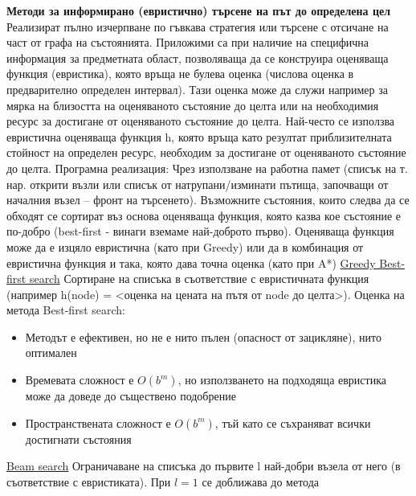 \documentclass{article}
\begin{document}
\textbf{Методи за информирано (евристично) търсене на път до определена цел} \newline\newline
Реализират пълно изчерпване по гъвкава стратегия или търсене с отсичане на част от графа на състоянията. Приложими са при
наличие на специфична информация за предметната област, позволяваща да се конструира оценяваща функция (евристика), която връща
не булева оценка (числова оценка в предварително определен интервал). Тази оценка може да служи например за мярка на близостта на
оценяваното състояние до целта или на необходимия ресурс за достигане от оценяваното състояние до целта. Най-често се използва
евристична оценяваща функция h, която връща като резултат приблизителната стойност на определен ресурс, необходим за достигане
от оценяваното състояние до целта. \newline\newline
Програмна реализация:
Чрез използване на работна памет (списък на т. нар. открити възли или списък от натрупани/изминати пътища, започващи от началния
възел – фронт на търсенето). Възможните състояния, които следва да се обходят се сортират въз основа оценяваща функция, която
казва кое състояние е по-добро (best-first - винаги вземаме най-доброто първо). Оценяваща функция може да е изцяло евристична
(като при Greedy) или да в комбинация от евристична функция и така, която дава точна оценка (като при A*) \newline\newline
\underline{Greedy Best-first search} \newline\newline
Сортиране на списъка в съответствие с евристичната функция (например h(node) = <оценка на цената на пътя от node до целта>). \newline
Оценка на метода Best-first search:
\begin{itemize}
    \item Методът е ефективен, но не е нито пълен (опасност от зацикляне), нито оптимален
    \item Времевата сложност е $O(b^m)$, но използването на подходяща евристика може да доведе до съществено подобрение
    \item Пространствената сложност е $O(b^m)$, тъй като се съхраняват всички достигнати състояния
\end{itemize}
\underline{Beam search} \newline\newline
Ограничаване на списъка до първите l най-добри възела от него (в съответствие с евристиката). При $l = 1$ се доближава до метода
\end{document}
